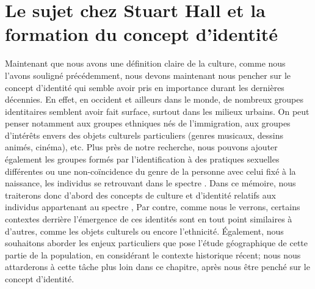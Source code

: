 \section{Le sujet chez Stuart Hall et la formation du concept d'identité}
\label{subsec:sujet_et_identité} Maintenant que nous avons une définition claire de la culture, comme nous l'avons souligné précédemment, nous devons maintenant nous pencher sur le concept d'identité qui semble avoir pris en importance durant les dernières décennies.
En effet, en occident et ailleurs dans le monde, de nombreux groupes identitaires semblent avoir fait surface, surtout dans les milieux urbains.
On peut penser notamment aux groupes ethniques nés de l'immigration, aux groupes d'intérêts envers des objets culturels particuliers (genres musicaux, dessins animés, cinéma), etc.
Plus près de notre recherche, nous pouvons ajouter également les groupes formés par l'identification à des pratiques sexuelles différentes ou une non-coïncidence du genre de la personne avec celui fixé à la naissance, les individus se retrouvant dans le spectre \lgbt{}.
Dans ce mémoire, nous traiterons donc d'abord des concepts de culture et d'identité relatifs aux individus appartenant au spectre \lgbt{},
Par contre, comme nous le verrons, certains contextes derrière l'émergence de ces identités sont en tout point similaires à d'autres, comme les objets culturels ou encore l'ethnicité.
Également, nous souhaitons aborder les enjeux particuliers que pose l'étude géographique de cette partie de la population, en considérant le contexte historique récent; nous nous attarderons à cette tâche plus loin dans ce chapitre, après nous être penché sur le concept d'identité.


